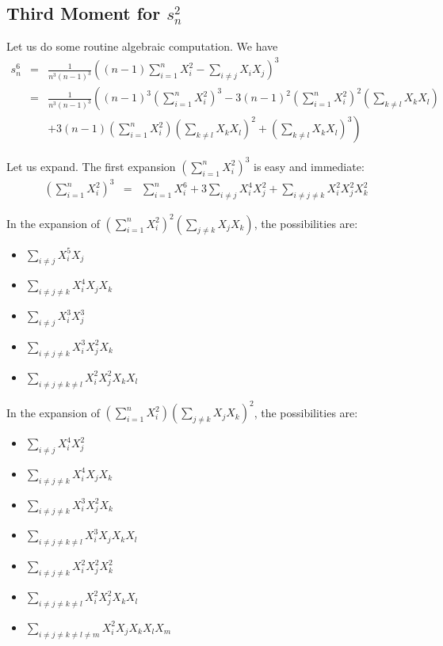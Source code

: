 \documentclass{imsart}
\numberwithin{equation}{section}
\theoremstyle{plain}
\theoremstyle{remark}
\begin{document}
\subsection{Third Moment for $s_n^2$}
Let us do some routine algebraic computation. We have
\begin{eqnarray}
s_n^6 &= & \frac{1}{n^3(n-1)^3} \left( (n-1) \sum_{i=1}^n X_i^2 - \sum_{i \neq j} X_i X_j  \right)^3 \\
& =& \frac{1}{n^3(n-1)^3} \left( (n-1)^3 (\sum_{i=1}^n X_i^2)^3 - 3 (n-1)^2 (\sum_{i=1}^n X_i^2)^2 ( \sum_{k \neq l} X_k X_l ) \right. \nonumber  \\
& & \left. + 3 (n-1) (\sum_{i=1}^n X_i^2) ( \sum_{k \neq l} X_k X_l )^2 + ( \sum_{k \neq l} X_k X_l )^3 \right)
\end{eqnarray}

Let us expand. The first expansion $(\sum_{i=1}^n X_i^2)^3 $ is easy and immediate:
\begin{eqnarray}
(\sum_{i=1}^n X_i^2)^3 & = &\sum_{i=1}^n X_i^6 + 3 \sum_{i \neq j} X_i^4 X_j^2 + \sum_{i \neq j \neq k} X_i^2 X_j^2 X_k^2 
\end{eqnarray}

In the expansion of $(\sum_{i=1}^n X_i^2)^2 (\sum_{j \neq k} X_j X_k)$, the possibilities are:
\begin{itemize}
\item $\sum_{i \neq j} X_i^5 X_j$
\item $\sum_{i \neq j \neq k} X_i^4 X_j X_k$  
\item $\sum_{i \neq j } X_i^3 X_j^3$ 
\item $\sum_{i \neq j \neq k} X_i^3 X_j^2 X_k$  
\item $\sum_{i \neq j \neq k \neq l} X_i^2 X_j^2 X_k X_l$ 
\end{itemize}

In the expansion of $(\sum_{i=1}^n X_i^2) (\sum_{j \neq k} X_j X_k)^2$, the possibilities are:
\begin{itemize}
\item $\sum_{i \neq j} X_i^4 X_j^2$  
\item $\sum_{i \neq j \neq k} X_i^4 X_j X_k$
\item $\sum_{i \neq j \neq k} X_i^3 X_j^2 X_k$  
\item $\sum_{i \neq j \neq k \neq l} X_i^3 X_j X_k X_l$  
\item $\sum_{i \neq j \neq k} X_i^2 X_j^2 X_k^2$  
\item $\sum_{i \neq j \neq k \neq l} X_i^2 X_j^2 X_k X_l$ 
\item $\sum_{i \neq j \neq k \neq l \neq m} X_i^2 X_j X_k X_l X_m$ 
\end{itemize}
\end{document}
